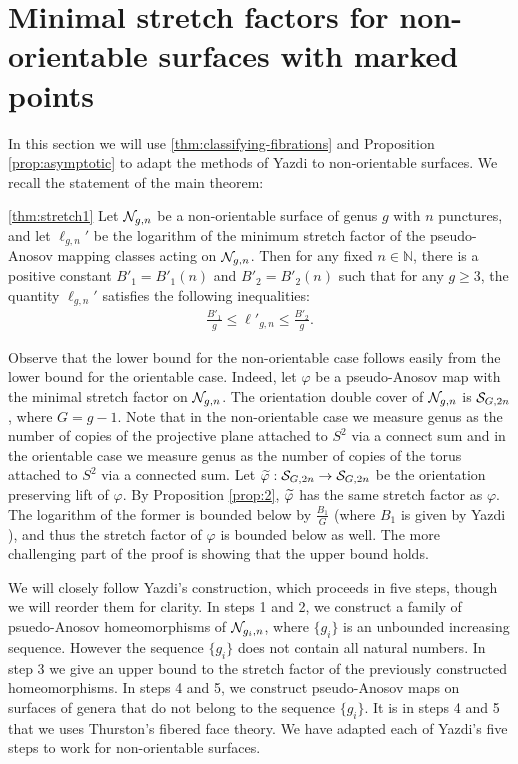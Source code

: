 \section{Minimal stretch factors for non-orientable surfaces with marked points}
\label{sec:application}

In this section we will use \autoref{thm:classifying-fibrations} and Proposition  \ref{prop:asymptotic} to adapt the methods of Yazdi \cite{yazdi2018pseudo} to non-orientable surfaces. We recall the statement of the main theorem:
\begin{manualtheorem}
  {\ref{thm:stretch1}}
Let $\mathcal{N}_{g,n}$ be a non-orientable surface of genus $g$ with $n$ punctures, and let $\ell_{g,n}'$ be the logarithm of
  the minimum stretch factor of the pseudo-Anosov mapping classes acting on $\mathcal{N}_{g,n}$.
  Then for any fixed $n \in \mathbb{N}$, there is a positive constant $B'_1 = B'_1(n)$ and $B'_2 = B'_2(n)$ such
  that for any $g \geq 3$,
  the quantity $\ell_{g,n}'$ satisfies the following inequalities:
  \begin{align*}
    \frac{B'_1}{g} \leq \ell'_{g,n} \leq \frac{B'_2}{g}.
  \end{align*}
\end{manualtheorem}





Observe that the lower bound for the non-orientable case follows easily from the lower bound for the orientable case.
Indeed, let $\varphi$ be a pseudo-Anosov map with the minimal stretch factor on $\mathcal{N}_{g,n}$. The orientation double cover of $\mathcal{N}_{g,n}$ is $\mathcal{S}_{G,2n}$, where $G = g-1$.  Note that in the non-orientable case we measure genus as the number of copies of the projective plane attached to $S^2$ via a connect sum and in the orientable case we measure genus as the number of copies of the torus attached to $S^2$ via a connected sum. Let $\widetilde{\varphi}:\mathcal{S}_{G, 2n}\to\mathcal{S}_{G,2n}$ be the orientation preserving lift of $\varphi$.
By Proposition \ref{prop:2}, $\widetilde{\varphi}$ has the same
stretch factor as $\varphi$. The logarithm of the former is bounded below by $\frac{B_1}{G}$ (where $B_1$ is given by Yazdi \cite{yazdi2018pseudo}), and thus the stretch factor of $\varphi$ is bounded
below as well. The more challenging part of the proof is showing that the upper bound holds. 

We will closely follow Yazdi's construction, which proceeds in five steps, though we will reorder them for clarity.  In steps 1 and 2, we construct a family of psuedo-Anosov homeomorphisms
of $\mathcal{N}_{g_i,n}$, where $\{g_i\}$ is an unbounded increasing sequence. However the sequence $\{g_i\}$ does not contain all natural numbers.  In step 3 we give an upper bound to the stretch factor of the previously constructed homeomorphisms. In steps 4 and 5, we construct pseudo-Anosov maps on surfaces of genera that do not belong to the sequence $\{g_i\}$. It is in steps 4 and 5 that we uses
Thurston's fibered face theory. We have adapted  each of Yazdi's five steps to work for non-orientable surfaces.

